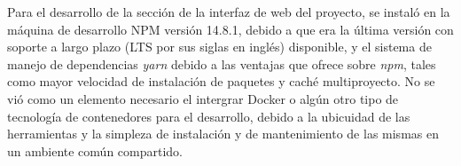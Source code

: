 Para el desarrollo de la sección de la interfaz de web del proyecto, se instaló en la máquina de desarrollo NPM versión 14.8.1, debido a que era la última versión con soporte a largo plazo (LTS por sus siglas en inglés) disponible, y el sistema de manejo de dependencias \textit{yarn} debido a las ventajas que ofrece sobre \textit{npm}, tales como mayor velocidad de instalación de paquetes y caché multiproyecto. No se vió como un elemento necesario el intergrar Docker o algún otro tipo de tecnología de contenedores para el desarrollo, debido a la ubicuidad de las herramientas y la simpleza de instalación y de mantenimiento de las mismas en un ambiente común compartido.
